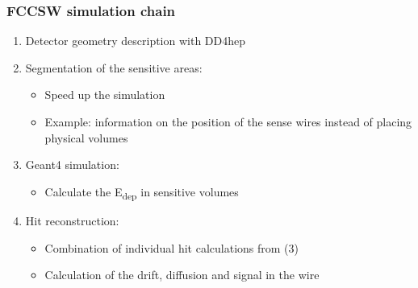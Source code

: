 \documentclass[hyperref={colorlinks=true,pdfpagelabels=false,linkcolor=black}, xcolor=dvipsnames,10pt]{beamer}
\begin{document}
\begin{frame}
	\frametitle{FCCSW simulation chain}

	\begin{enumerate}
	\item Detector geometry description with DD4hep \vspace{0.2cm}
	\item Segmentation of the sensitive areas: \vspace{0.2cm}
		\begin{itemize}
    \item Speed up the simulation
		\item Example: information on the position of the sense wires instead of placing physical volumes \vspace{0.2cm}
		\end{itemize}
	\item Geant4 simulation: \vspace{0.2cm}
		\begin{itemize}
		\item Calculate the E\textsubscript{dep} in sensitive volumes \vspace{0.2cm}
		\end{itemize}
	\item Hit reconstruction: \vspace{0.2cm}
		\begin{itemize}
		\item Combination of individual hit calculations from (3)
		\item Calculation of the drift, diffusion and signal in the wire \vspace{0.2cm}
		\end{itemize}
	\end{enumerate}

  \vspace{0.5cm}
	\centering


\end{frame}
\end{document}
